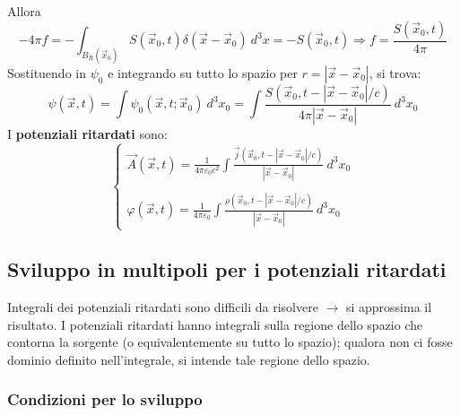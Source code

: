\documentclass[a4paper]{scrartcl}
\numberwithin{equation}{subsection}
\theoremstyle{style1}
\begin{document}
Allora
\[
-4 \pi f = - \int_{B_R(\vec{x}_0)} S(\vec{x}_0,t) \delta (\vec{x}-\vec{x}_0) \ d^{3} x = - S(\vec{x}_0,t) \Rightarrow f = \frac{S(\vec{x}_0,t)}{4\pi}
\] 
Sostituendo in $\psi _0$ e integrando su tutto lo spazio per $r=\left\lvert \vec{x}-\vec{x}_0 \right\rvert $, si trova:
\begin{equation}
	\psi (\vec{x},t) = \int \psi _0 (\vec{x},t;\vec{x}_0) \ d^3 x_0 = \int \frac{S(\vec{x}_0, t - \left\lvert \vec{x}-\vec{x}_0 \right\rvert /c)}{4\pi \left\lvert \vec{x}-\vec{x}_0 \right\rvert }\ d^3 x_0
\end{equation}
I \textbf{potenziali ritardati} sono:
\begin{equation}
	\begin{cases}
		\displaystyle \vec{A}(\vec{x},t) = \frac{1}{4\pi \varepsilon _0 c^2}\int \frac{\vec{j}(\vec{x}_0, t - \left\lvert \vec{x}-\vec{x}_0 \right\rvert / c)}{\left\lvert \vec{x}-\vec{x}_0 \right\rvert } \ d^3x_0 \\
		\\
		\displaystyle \varphi (\vec{x},t) = \frac{1}{4\pi \varepsilon _0}\int \frac{\rho (\vec{x}_0,t - \left\lvert \vec{x}-\vec{x}_0 \right\rvert / c)}{\left\lvert \vec{x}-\vec{x}_0 \right\rvert }\ d^3 x_0
	\end{cases}
\end{equation}
\subsection{Sviluppo in multipoli per i potenziali ritardati}

Integrali dei potenziali ritardati sono difficili da risolvere $\to$ si approssima il risultato. I potenziali ritardati hanno integrali sulla regione dello spazio che contorna la sorgente (o equivalentemente su tutto lo spazio); qualora non ci fosse dominio definito nell'integrale, si intende tale regione dello spazio.
\subsubsection{Condizioni per lo sviluppo}
\end{document}

